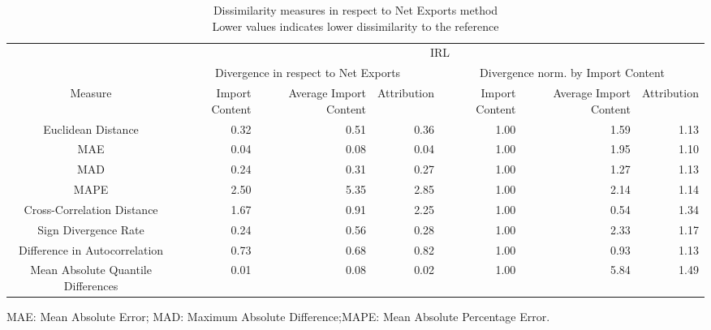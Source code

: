 \begin{table}[t]
\caption*{
{\large Dissimilarity measures in respect to Net Exports method} \\ 
{\small Lower values indicates lower dissimilarity to the reference}
} 
\fontsize{15.0pt}{18.0pt}\selectfont
\begin{tabular*}{\linewidth}{@{\extracolsep{\fill}}crrrrrr}
\toprule
 & \multicolumn{6}{c}{IRL} \\ 
\cmidrule(lr){2-7}
 & \multicolumn{3}{c}{Divergence in respect to Net Exports} & \multicolumn{3}{c}{Divergence norm. by Import Content} \\ 
\cmidrule(lr){2-4} \cmidrule(lr){5-7}
Measure & Import Content & Average Import Content & Attribution & Import Content & Average Import Content & Attribution \\ 
\midrule\addlinespace[2.5pt]
Euclidean Distance & 0.32 & 0.51 & 0.36 & 1.00 & 1.59 & 1.13 \\ 
MAE & 0.04 & 0.08 & 0.04 & 1.00 & 1.95 & 1.10 \\ 
MAD & 0.24 & 0.31 & 0.27 & 1.00 & 1.27 & 1.13 \\ 
MAPE & 2.50 & 5.35 & 2.85 & 1.00 & 2.14 & 1.14 \\ 
Cross-Correlation Distance & 1.67 & 0.91 & 2.25 & 1.00 & 0.54 & 1.34 \\ 
Sign Divergence Rate & 0.24 & 0.56 & 0.28 & 1.00 & 2.33 & 1.17 \\ 
Difference in Autocorrelation & 0.73 & 0.68 & 0.82 & 1.00 & 0.93 & 1.13 \\ 
Mean Absolute Quantile Differences & 0.01 & 0.08 & 0.02 & 1.00 & 5.84 & 1.49 \\ 
\bottomrule
\end{tabular*}
\begin{minipage}{\linewidth}
MAE: Mean Absolute Error; MAD: Maximum Absolute Difference;MAPE: Mean Absolute Percentage Error.\\
\end{minipage}
\end{table}

